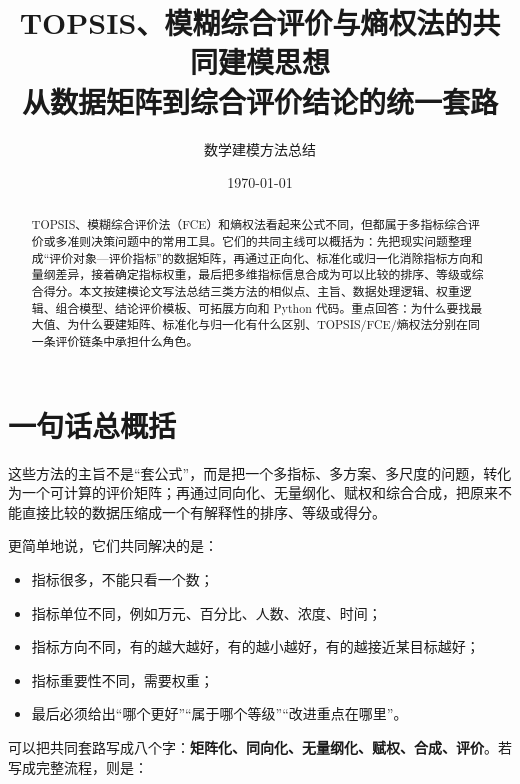 \documentclass[UTF8,zihao=-4]{ctexart}
\title{TOPSIS、模糊综合评价与熵权法的共同建模思想\\\large 从数据矩阵到综合评价结论的统一套路}
\author{数学建模方法总结}
\date{\today}
\begin{document}
\maketitle

\begin{abstract}
TOPSIS、模糊综合评价法（FCE）和熵权法看起来公式不同，但都属于多指标综合评价或多准则决策问题中的常用工具。它们的共同主线可以概括为：先把现实问题整理成“评价对象—评价指标”的数据矩阵，再通过正向化、标准化或归一化消除指标方向和量纲差异，接着确定指标权重，最后把多维指标信息合成为可以比较的排序、等级或综合得分。本文按建模论文写法总结三类方法的相似点、主旨、数据处理逻辑、权重逻辑、组合模型、结论评价模板、可拓展方向和 Python 代码。重点回答：为什么要找最大值、为什么要建矩阵、标准化与归一化有什么区别、TOPSIS/FCE/熵权法分别在同一条评价链条中承担什么角色。
\end{abstract}

\tableofcontents
\newpage

\section{一句话总概括}
\begin{tcolorbox}
这些方法的主旨不是“套公式”，而是把一个多指标、多方案、多尺度的问题，转化为一个可计算的评价矩阵；再通过同向化、无量纲化、赋权和综合合成，把原来不能直接比较的数据压缩成一个有解释性的排序、等级或得分。
\end{tcolorbox}

更简单地说，它们共同解决的是：
\begin{itemize}
  \item 指标很多，不能只看一个数；
  \item 指标单位不同，例如万元、百分比、人数、浓度、时间；
  \item 指标方向不同，有的越大越好，有的越小越好，有的越接近某目标越好；
  \item 指标重要性不同，需要权重；
  \item 最后必须给出“哪个更好”“属于哪个等级”“改进重点在哪里”。
\end{itemize}

可以把共同套路写成八个字：\textbf{矩阵化、同向化、无量纲化、赋权、合成、评价}。若写成完整流程，则是：
\end{document}
